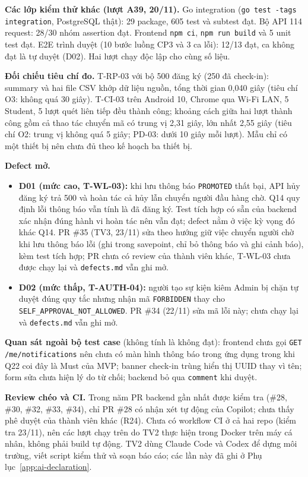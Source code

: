 \textbf{Các lớp kiểm thử khác (lượt A39, 20/11).} Go integration (\texttt{go test -tags integration}, PostgreSQL thật): 29 package, 605 test và subtest đạt. Bộ API 114 request: 28/30 nhóm assertion đạt. Frontend \texttt{npm ci}, \texttt{npm run build} và 5 unit test đạt. E2E trình duyệt (10 bước luồng CP3 và 3 ca lỗi): 12/13 đạt, ca không đạt là tự duyệt (D02). Hai lượt chạy độc lập cho cùng số liệu.

\textbf{Đối chiếu tiêu chí đo.} T-RP-03 với bộ 500 đăng ký (250 đã check-in): summary và hai file CSV khớp dữ liệu nguồn, tổng thời gian 0,040 giây (tiêu chí O3: không quá 30 giây). T-CI-03 trên Android 10, Chrome qua Wi-Fi LAN, 5 Student, 5 lượt quét liên tiếp đều thành công; khoảng cách giữa hai lượt thành công gồm cả thao tác chuyển mã có trung vị 2,31 giây, lớn nhất 2,55 giây (tiêu chí O2: trung vị không quá 5 giây; PD-03: dưới 10 giây mỗi lượt). Mẫu chỉ có một thiết bị nên chưa đủ theo kế hoạch ba thiết bị.

\textbf{Defect mở.}
\begin{itemize}
  \item \textbf{D01 (mức cao, T-WL-03):} khi lưu thông báo \texttt{PROMOTED} thất bại, API hủy đăng ký trả 500 và hoàn tác cả hủy lẫn chuyển người đầu hàng chờ. Q14 quy định lỗi thông báo vẫn tính là đã đăng ký. Test tích hợp có sẵn của backend xác nhận đúng hành vi hoàn tác nên vẫn đạt; defect nằm ở việc kỳ vọng đó khác Q14. PR \#35 (TV3, 23/11) sửa theo hướng giữ việc chuyển người chờ khi lưu thông báo lỗi (ghi trong savepoint, chỉ bỏ thông báo và ghi cảnh báo), kèm test tích hợp; PR chưa có review của thành viên khác, T-WL-03 chưa được chạy lại và \texttt{defects.md} vẫn ghi mở.
  \item \textbf{D02 (mức thấp, T-AUTH-04):} người tạo sự kiện kiêm Admin bị chặn tự duyệt đúng quy tắc nhưng nhận mã \texttt{FORBIDDEN} thay cho \texttt{SELF\_APPROVAL\_NOT\_ALLOWED}. PR \#34 (22/11) sửa mã lỗi này; chưa chạy lại và \texttt{defects.md} vẫn ghi mở.
\end{itemize}

\textbf{Quan sát ngoài bộ test case} (không tính là không đạt): frontend chưa gọi \texttt{GET /me/notifications} nên chưa có màn hình thông báo trong ứng dụng trong khi Q22 coi đây là Must của MVP; banner check-in trùng hiển thị UUID thay vì tên; form sửa chưa hiện lý do từ chối; backend bỏ qua \texttt{comment} khi duyệt.

\textbf{Review chéo và CI.} Trong năm PR backend gần nhất được kiểm tra (\#28, \#30, \#32, \#33, \#34), chỉ PR \#28 có nhận xét tự động của Copilot; chưa thấy phê duyệt của thành viên khác (R24). Chưa có workflow CI ở cả hai repo (kiểm tra 23/11), nên các lượt chạy trên do TV2 thực hiện trong Docker trên máy cá nhân, không phải build tự động. TV2 dùng Claude Code và Codex để dựng môi trường, viết script kiểm thử và soạn báo cáo; các lần này đã ghi ở Phụ lục~\ref{app:ai-declaration}.

